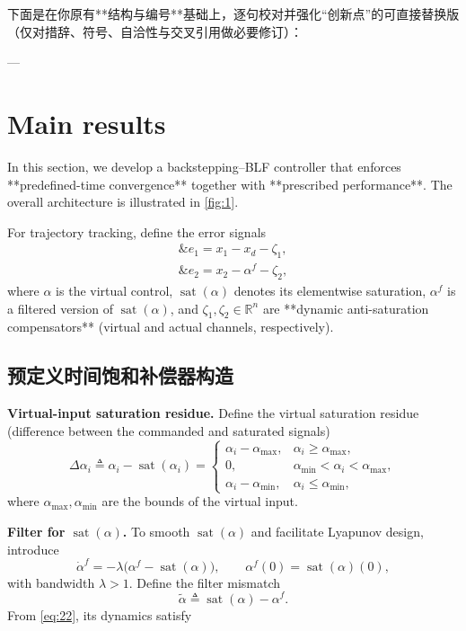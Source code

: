 \documentclass[pdflatex,sn-mathphys-num]{sn-jnl}%
\theoremstyle{thmstyleone}%
\theoremstyle{thmstyletwo}%
\theoremstyle{thmstylethree}%
\begin{document}
	下面是在你原有**结构与编号**基础上，逐句校对并强化“创新点”的可直接替换版（仅对措辞、符号、自洽性与交叉引用做必要修订）：

	---
	
	\section{Main results}
	
	In this section, we develop a backstepping–BLF controller that enforces **predefined-time convergence** together with **prescribed performance**. The overall architecture is illustrated in \cref{fig:1}.
	
	\par For trajectory tracking, define the error signals
	\begin{subequations}\label{eq:20}
	\begin{align}
	\&e_{1}=x_{1}-x_{d}-\zeta_{1},\\
	\&e_{2}=x_{2}-\alpha^{f}-\zeta_{2},
	\end{align}
	\end{subequations}
	where $\alpha$ is the virtual control, $\operatorname{sat}(\alpha)$ denotes its elementwise saturation, $\alpha^{f}$ is a filtered version of $\operatorname{sat}(\alpha)$, and $\zeta_{1},\zeta_{2}\in\mathbb{R}^{n}$ are **dynamic anti-saturation compensators** (virtual and actual channels, respectively).
	
	\subsection{预定义时间饱和补偿器构造}
	
	\noindent\textbf{Virtual-input saturation residue.} Define the virtual saturation residue (difference between the commanded and saturated signals)
	\begin{equation}\label{eq:21}
	\Delta \alpha_{i}\triangleq \alpha_{i}-\operatorname{sat}(\alpha_{i})=
	\begin{cases}
	\alpha_{i}-\alpha_{\max}, & \alpha_{i}\ge \alpha_{\max},\\
	0,                        & \alpha_{\min}<\alpha_{i}<\alpha_{\max},\\
	\alpha_{i}-\alpha_{\min}, & \alpha_{i}\le \alpha_{\min},
	\end{cases}
	\end{equation}
	where $\alpha_{\max},\alpha_{\min}$ are the bounds of the virtual input.
	
	\noindent\textbf{Filter for $\operatorname{sat}(\alpha)$.} To smooth $\operatorname{sat}(\alpha)$ and facilitate Lyapunov design, introduce
	\begin{equation}\label{eq:22}
	\dot{\alpha}^{f}=-\lambda\big(\alpha^{f}-\operatorname{sat}(\alpha)\big),\qquad
	\alpha^{f}(0)=\operatorname{sat}(\alpha)(0),
	\end{equation}
	with bandwidth $\lambda>1$. Define the filter mismatch
	\begin{equation}\label{eq:23}
	\tilde{\alpha}\triangleq \operatorname{sat}(\alpha)-\alpha^{f}.
	\end{equation}
	From \cref{eq:22}, its dynamics satisfy
	
\end{document}
